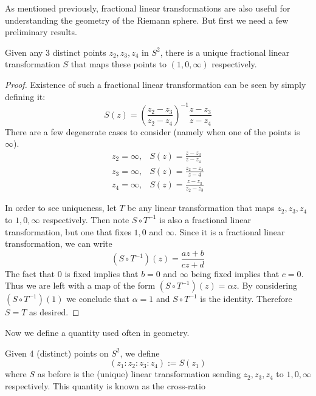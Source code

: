 As mentioned previously, fractional linear transformations are also useful for understanding the geometry of the Riemann sphere. But first we need a few preliminary results.
\begin{lemma}
Given any 3 distinct points $z_2, z_3, z_4$ in $S^2$, there is a unique fractional linear transformation $S$ that maps these points to $(1, 0, \infty)$ respectively.
\end{lemma}
\begin{proof}
Existence of such a fractional linear transformation can be seen by simply defining it:
$$ S(z) = \left( \frac{z_2 - z_3}{z_2 - z_4} \right)^{-1} \frac{z - z_3}{z - z_4} $$
There are a few degenerate cases to consider (namely when one of the points is $\infty$). 
\begin{align*}
    z_2 = \infty, &S(z) = \frac{z - z_3}{z - z_4}\\
    z_3 = \infty, &S(z) = \frac{z_2 - z_4}{z - 4}\\
    z_4 = \infty, &S(z) = \frac{z - z_3}{z_2 - z_3}
\end{align*}

In order to see uniqueness, let $T$ be any linear transformation that maps $z_2, z_3, z_4$ to $1, 0, \infty$ respectively. Then note $S \circ T^{-1}$ is also a fractional linear transformation, but one that fixes $1, 0$ and $\infty$.
Since it is a fractional linear transformation, we can write
$$(S \circ T^{-1})(z) = \frac{az + b}{cz + d}$$
The fact that $0$ is fixed implies that $b = 0$ and $\infty$ being fixed implies that $c = 0$. Thus we are left with a map of the form $(S \circ T^{-1})(z) = \alpha z$. By considering $(S \circ T^{-1})(1)$ we conclude that $\alpha = 1$ and $S \circ T^{-1}$ is the identity. Therefore $S = T$ as desired. 
\end{proof}
Now we define a quantity used often in geometry.
\begin{definition}
Given 4 (distinct) points on $S^2$, we define $$(z_1:z_2:z_3:z_4) := S(z_1)$$ where $S$ as before is the (unique) linear transformation sending $z_2, z_3, z_4$ to $1, 0, \infty$ respectively. This quantity is known as the cross-ratio
\end{definition}

